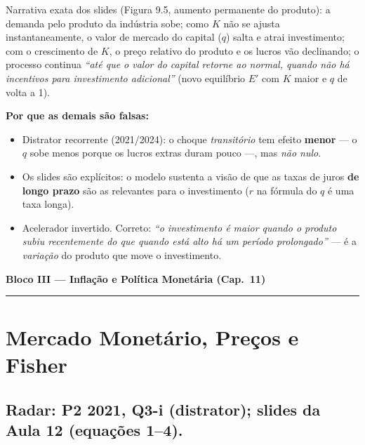 \documentclass[12pt, a4paper]{article}
\begin{document}
\begin{correctbox}[title={Resposta correta: a)}]
Narrativa exata dos slides (Figura 9.5, aumento permanente do produto): a
demanda pelo produto da indústria sobe; como $K$ não se ajusta
instantaneamente, o valor de mercado do capital ($q$) salta e atrai
investimento; com o crescimento de $K$, o preço relativo do produto e os lucros
vão declinando; o processo continua \emph{``até que o valor do capital retorne
ao normal, quando não há incentivos para investimento adicional''} (novo
equilíbrio $E'$ com $K$ maior e $q$ de volta a 1). \checkmark

\textbf{Por que as demais são falsas:}
\begin{itemize}[leftmargin=*]
\item[b)] Distrator recorrente (2021/2024): o choque \emph{transitório} tem
efeito \textbf{menor} --- o $q$ sobe menos porque os lucros extras duram pouco
---, mas \emph{não nulo}.
\item[c)] Os slides são explícitos: o modelo sustenta a visão de que as taxas
de juros \textbf{de longo prazo} são as relevantes para o investimento
($r$ na fórmula do $q$ é uma taxa longa).
\item[d)] Acelerador invertido. Correto: \emph{``o investimento é maior quando
o produto subiu recentemente do que quando está alto há um período
prolongado''} --- é a \emph{variação} do produto que move o investimento.
\end{itemize}
\end{correctbox}

\newpage
\begin{center}
{\large\bfseries\color{cyanrbc} Bloco III --- Inflação e Política Monetária (Cap.\ 11)}\\[0.2em]
\rule{\linewidth}{0.6pt}
\end{center}

\section{Mercado Monetário, Preços e Fisher}

\subsection{Radar: P2 2021, Q3-i (distrator); slides da Aula 12 (equações 1--4).}
\end{document}
